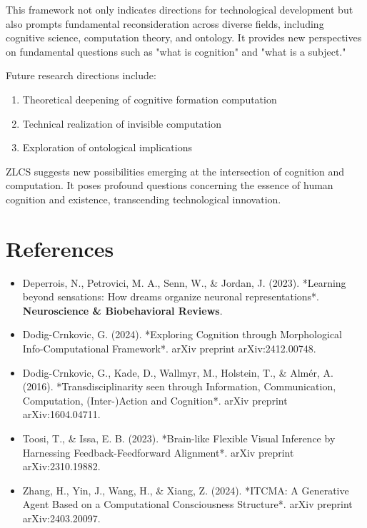 \documentclass{article}
\begin{document}
This framework not only indicates directions for technological development but also prompts fundamental reconsideration across diverse fields, including cognitive science, computation theory, and ontology. It provides new perspectives on fundamental questions such as "what is cognition" and "what is a subject."

Future research directions include:
\begin{enumerate}
    \item Theoretical deepening of cognitive formation computation
    \item Technical realization of invisible computation
    \item Exploration of ontological implications
\end{enumerate}

ZLCS suggests new possibilities emerging at the intersection of cognition and computation. It poses profound questions concerning the essence of human cognition and existence, transcending technological innovation.

\section*{References}

\begin{itemize}
    \item Deperrois, N., Petrovici, M. A., Senn, W., \& Jordan, J. (2023). *Learning beyond sensations: How dreams organize neuronal representations*. \textbf{Neuroscience \& Biobehavioral Reviews}.
    \item Dodig-Crnkovic, G. (2024). *Exploring Cognition through Morphological Info-Computational Framework*. arXiv preprint arXiv:2412.00748.
    \item Dodig-Crnkovic, G., Kade, D., Wallmyr, M., Holstein, T., \& Almér, A. (2016). *Transdisciplinarity seen through Information, Communication, Computation, (Inter-)Action and Cognition*. arXiv preprint arXiv:1604.04711.
    \item Toosi, T., \& Issa, E. B. (2023). *Brain-like Flexible Visual Inference by Harnessing Feedback-Feedforward Alignment*. arXiv preprint arXiv:2310.19882.
    \item Zhang, H., Yin, J., Wang, H., \& Xiang, Z. (2024). *ITCMA: A Generative Agent Based on a Computational Consciousness Structure*. arXiv preprint arXiv:2403.20097.
\end{itemize}
\end{document}
